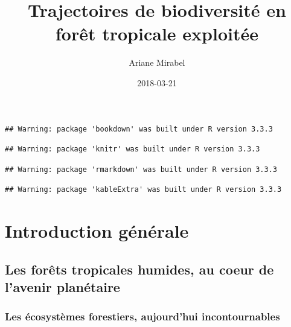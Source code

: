 \documentclass[
  11pt,
  french,
  A4paper,
  extrafontsizes,onecolumn,openright
  ]{memoir}
\title{Trajectoires de biodiversité en forêt tropicale exploitée}
\author{Ariane Mirabel}
\date{2018-03-21}
\begin{document}
\frontmatter



\makeflyleaf









\LargeMargins
{
\hypersetup{linkcolor=}
\setcounter{tocdepth}{3}
\tableofcontents
}



\LargeMargins
\begin{verbatim}
## Warning: package 'bookdown' was built under R version 3.3.3
\end{verbatim}

\begin{verbatim}
## Warning: package 'knitr' was built under R version 3.3.3
\end{verbatim}

\begin{verbatim}
## Warning: package 'rmarkdown' was built under R version 3.3.3
\end{verbatim}

\begin{verbatim}
## Warning: package 'kableExtra' was built under R version 3.3.3
\end{verbatim}

\mainmatter

\chapter{Introduction générale}\label{introduction-generale}

\section{Les forêts tropicales humides, au coeur de l'avenir
planétaire}\label{les-forets-tropicales-humides-au-coeur-de-lavenir-planetaire}

\subsection{Les écosystèmes forestiers, aujourd'hui
incontournables}\label{les-ecosystemes-forestiers-aujourdhui-incontournables}
\end{document}
